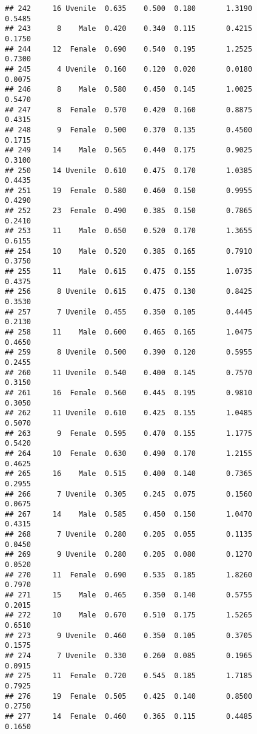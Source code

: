 \documentclass[
]{article}
\begin{document}
\begin{verbatim}
## 242     16 Uvenile  0.635    0.500  0.180       1.3190         0.5485
## 243      8    Male  0.420    0.340  0.115       0.4215         0.1750
## 244     12  Female  0.690    0.540  0.195       1.2525         0.7300
## 245      4 Uvenile  0.160    0.120  0.020       0.0180         0.0075
## 246      8    Male  0.580    0.450  0.145       1.0025         0.5470
## 247      8  Female  0.570    0.420  0.160       0.8875         0.4315
## 248      9  Female  0.500    0.370  0.135       0.4500         0.1715
## 249     14    Male  0.565    0.440  0.175       0.9025         0.3100
## 250     14 Uvenile  0.610    0.475  0.170       1.0385         0.4435
## 251     19  Female  0.580    0.460  0.150       0.9955         0.4290
## 252     23  Female  0.490    0.385  0.150       0.7865         0.2410
## 253     11    Male  0.650    0.520  0.170       1.3655         0.6155
## 254     10    Male  0.520    0.385  0.165       0.7910         0.3750
## 255     11    Male  0.615    0.475  0.155       1.0735         0.4375
## 256      8 Uvenile  0.615    0.475  0.130       0.8425         0.3530
## 257      7 Uvenile  0.455    0.350  0.105       0.4445         0.2130
## 258     11    Male  0.600    0.465  0.165       1.0475         0.4650
## 259      8 Uvenile  0.500    0.390  0.120       0.5955         0.2455
## 260     11 Uvenile  0.540    0.400  0.145       0.7570         0.3150
## 261     16  Female  0.560    0.445  0.195       0.9810         0.3050
## 262     11 Uvenile  0.610    0.425  0.155       1.0485         0.5070
## 263      9  Female  0.595    0.470  0.155       1.1775         0.5420
## 264     10  Female  0.630    0.490  0.170       1.2155         0.4625
## 265     16    Male  0.515    0.400  0.140       0.7365         0.2955
## 266      7 Uvenile  0.305    0.245  0.075       0.1560         0.0675
## 267     14    Male  0.585    0.450  0.150       1.0470         0.4315
## 268      7 Uvenile  0.280    0.205  0.055       0.1135         0.0450
## 269      9 Uvenile  0.280    0.205  0.080       0.1270         0.0520
## 270     11  Female  0.690    0.535  0.185       1.8260         0.7970
## 271     15    Male  0.465    0.350  0.140       0.5755         0.2015
## 272     10    Male  0.670    0.510  0.175       1.5265         0.6510
## 273      9 Uvenile  0.460    0.350  0.105       0.3705         0.1575
## 274      7 Uvenile  0.330    0.260  0.085       0.1965         0.0915
## 275     11  Female  0.720    0.545  0.185       1.7185         0.7925
## 276     19  Female  0.505    0.425  0.140       0.8500         0.2750
## 277     14  Female  0.460    0.365  0.115       0.4485         0.1650

\end{verbatim}
\end{document}
